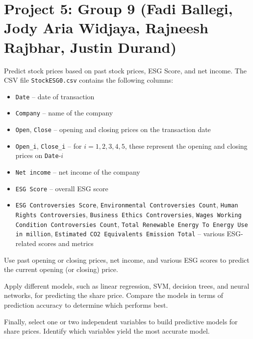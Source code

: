 \documentclass{article}
\begin{document}
\section*{Project 5: Group 9 (Fadi Ballegi, Jody Aria Widjaya, Rajneesh Rajbhar, Justin Durand)  }
Predict stock prices based on past stock prices, ESG Score, and net income. The CSV file \lstinline$StockESG0.csv$ contains the following columns: \begin{itemize} \item \lstinline$Date$ -- date of transaction \item \lstinline$Company$ -- name of the company \item \lstinline$Open$, \lstinline$Close$ -- opening and closing prices on the transaction date \item \lstinline$Open_i$, \lstinline$Close_i$ -- for $i=1,2,3,4,5$, these represent the opening and closing prices on \lstinline$Date$-$i$ \item \lstinline$Net income$ -- net income of the company \item \lstinline$ESG Score$ -- overall ESG score \item \lstinline$ESG Controversies Score$, \lstinline$Environmental Controversies Count$, \lstinline$Human Rights Controversies$, \lstinline$Business Ethics Controversies$, \lstinline$Wages Working Condition Controversies Count$, \lstinline$Total Renewable Energy To Energy Use in million$, \lstinline$Estimated CO2 Equivalents Emission Total$ -- various ESG-related scores and metrics \end{itemize}

Use past opening or closing prices, net income, and various ESG scores to predict the current opening (or closing) price.

Apply different models, such as linear regression, SVM, decision trees, and neural networks, for predicting the share price. Compare the models in terms of prediction accuracy to determine which performs best.

 Finally, select one or two independent variables to build predictive models for share prices. Identify which variables yield the most accurate model. 
\end{document}
